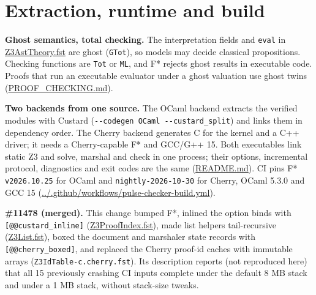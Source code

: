 \documentclass[10pt,a4paper]{article}
\begin{document}
\section{Extraction, runtime and build}\label{sec:6-extraction-runtime-and-build}

\textbf{Ghost semantics, total checking.} The interpretation fields and \texttt{eval} in \href{https://github.com/Z3Prover/z3/blob/8fbb275aba0472e862e289c7af1331b3bd5d512c/fstar/Z3AstTheory.fst\#L289-L325}{Z3Ast\allowbreak{}Theory.\allowbreak{}fst} are ghost (\texttt{GTot}), so models may decide classical propositions. Checking functions are \texttt{Tot} or \texttt{ML}, and F* rejects ghost results in executable code. Proofs that run an executable evaluator under a ghost valuation use ghost twins (\href{https://github.com/Z3Prover/z3/blob/8fbb275aba0472e862e289c7af1331b3bd5d512c/fstar/PROOF_CHECKING.md\#L55}{PROOF\_\allowbreak{}CHECKING.\allowbreak{}md}).

\textbf{Two backends from one source.} The OCaml backend extracts the verified modules with Custard (\texttt{-{}\allowbreak{}-{}\allowbreak{}codegen OCaml -{}\allowbreak{}-{}\allowbreak{}custard\_\allowbreak{}split}) and links them in dependency order. The Cherry backend generates C for the kernel and a C++ driver; it needs a Cherry-capable F* and GCC/G++ 15. Both executables link static Z3 and solve, marshal and check in one process; their options, incremental protocol, diagnostics and exit codes are the same (\href{https://github.com/Z3Prover/z3/blob/8fbb275aba0472e862e289c7af1331b3bd5d512c/fstar/README.md\#L56-L66}{README.\allowbreak{}md}). CI pins F* \texttt{v2026.\allowbreak{}10.\allowbreak{}25} for OCaml and \texttt{nightly-{}\allowbreak{}2026-{}\allowbreak{}10-{}\allowbreak{}30} for Cherry, OCaml 5.3.0 and GCC 15 (\href{https://github.com/Z3Prover/z3/blob/8fbb275aba0472e862e289c7af1331b3bd5d512c/.github/workflows/pulse-checker-build.yml\#L40-L91}{.\allowbreak{}.\allowbreak{}/\allowbreak{}.\allowbreak{}github/\allowbreak{}workflows/\allowbreak{}pulse-checker-build.\allowbreak{}yml}).

\textbf{\#11478 (merged).} This change bumped F*, inlined the option binds with \texttt{[@@custard\_\allowbreak{}inline]} (\href{https://github.com/Z3Prover/z3/blob/8fbb275aba0472e862e289c7af1331b3bd5d512c/fstar/Z3ProofIndex.fst\#L3-L10}{Z3Proof\allowbreak{}Index.\allowbreak{}fst}), made list helpers tail-recursive (\href{https://github.com/Z3Prover/z3/blob/8fbb275aba0472e862e289c7af1331b3bd5d512c/fstar/Z3List.fst}{Z3List.\allowbreak{}fst}), boxed the document and marshaler state records with \texttt{[@@cherry\_\allowbreak{}boxed]}, and replaced the Cherry proof-id caches with immutable arrays (\texttt{Z3IdTable-{}\allowbreak{}c.\allowbreak{}cherry.\allowbreak{}fst}). Its description reports (not reproduced here) that all 15 previously crashing CI inputs complete under the default 8 MB stack and under a 1 MB stack, without stack-size tweaks.
\end{document}
